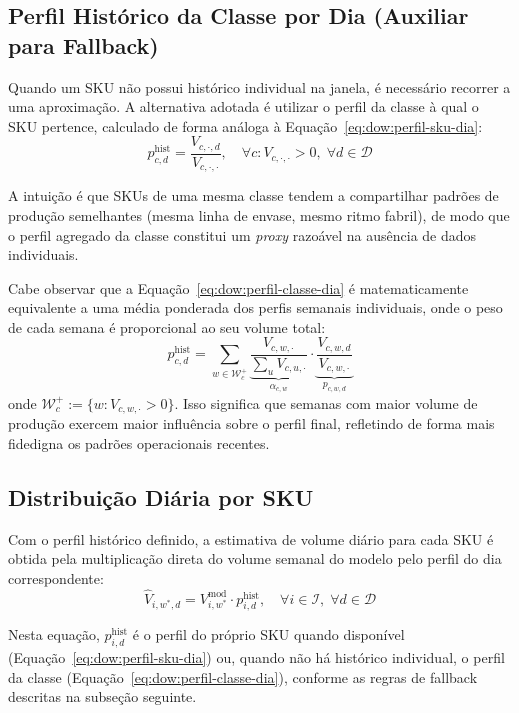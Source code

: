 \documentclass[11pt,a4paper]{article}
\begin{document}
\subsection{Perfil Histórico da Classe por Dia (Auxiliar para Fallback)}

Quando um SKU não possui histórico individual na janela, é necessário recorrer
a uma aproximação. A alternativa adotada é utilizar o perfil da classe à qual
o SKU pertence, calculado de forma análoga à
Equação~\eqref{eq:dow:perfil-sku-dia}:
\begin{equation}\label{eq:dow:perfil-classe-dia}
p^{\text{hist}}_{c,d} = \frac{V_{c,\cdot,d}}{V_{c,\cdot,\cdot}},
\quad \forall c : V_{c,\cdot,\cdot}>0,\;\forall d \in \mathcal{D}
\end{equation}

A intuição é que SKUs de uma mesma classe tendem a compartilhar padrões de
produção semelhantes (mesma linha de envase, mesmo ritmo fabril), de modo que
o perfil agregado da classe constitui um \emph{proxy} razoável na ausência de
dados individuais.

Cabe observar que a Equação~\eqref{eq:dow:perfil-classe-dia} é matematicamente
equivalente a uma média ponderada dos perfis semanais individuais, onde o peso
de cada semana é proporcional ao seu volume total:
\[
p^{\text{hist}}_{c,d}
= \sum_{w \in \mathcal{W}^{+}_c}
  \underbrace{\frac{V_{c,w,\cdot}}{\sum_u V_{c,u,\cdot}}}_{\alpha_{c,w}}
  \cdot
  \underbrace{\frac{V_{c,w,d}}{V_{c,w,\cdot}}}_{p_{c,w,d}}
\]
onde $\mathcal{W}^{+}_c := \{w : V_{c,w,\cdot}>0\}$. Isso significa que
semanas com maior volume de produção exercem maior influência sobre o perfil
final, refletindo de forma mais fidedigna os padrões operacionais recentes.

\subsection{Distribuição Diária por SKU}

Com o perfil histórico definido, a estimativa de volume diário para cada SKU
é obtida pela multiplicação direta do volume semanal do modelo pelo perfil
do dia correspondente:
\begin{equation}\label{eq:dow:distribuicao-diaria}
\hat{V}_{i,w^*,d} = V^{\text{mod}}_{i,w^*} \cdot p^{\text{hist}}_{i,d},
\quad \forall i \in \mathcal{I},\;\forall d \in \mathcal{D}
\end{equation}

Nesta equação, $p^{\text{hist}}_{i,d}$ é o perfil do próprio SKU quando
disponível (Equação~\eqref{eq:dow:perfil-sku-dia}) ou, quando não há
histórico individual, o perfil da classe
(Equação~\eqref{eq:dow:perfil-classe-dia}), conforme as regras de fallback
descritas na subseção seguinte.
\end{document}
